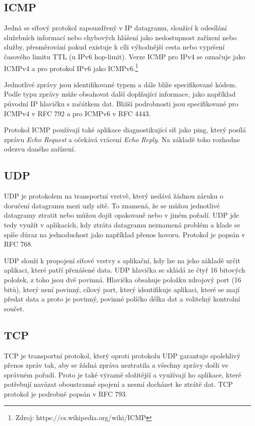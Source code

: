 \documentclass[11pt, a4paper]{article}
\begin{document}
\subsection{ICMP}

Jedná se síťový protokol zapouzdřený v IP datagramu, sloužící k odesílání služebních informací nebo chybových hlášení jako nedostupnost zařízení nebo služby, přesměrování pokud existuje k cíli výhodnější cesta nebo vypršení časového limitu TTL (u IPv6 hop-limit). 
Verze ICMP pro IPv4 se označuje jako ICMPv4 a pro protokol IPv6 jako ICMPv6.\footnote{Zdroj: https://cs.wikipedia.org/wiki/ICMP} 

Jednotlivé zprávy jsou identifikované typem a dále blíže specifikované kódem. 
Podle typu zprávy  může obsahovat další doplňující informace, jako například původní IP hlavičku s začátkem dat. 
Bližší podrobnosti jsou specifikované pro ICMPv4 v RFC 792 a pro ICMPv6 v RFC 4443. \cite{rfc:792, rfc:4443}

Protokol ICMP používají také aplikace diagnostikující síť jako ping, který posílá zprávu \emph{Echo Request} a očekává vrácení \emph{Echo Reply}. 
Na základě toho rozhodne odezvu daného zařízení. 

\subsection{UDP}

UDP je protokolem na transportní vrstvě, který nedává žádnou záruku o doručení datagramu mezi uzly sítě. 
To znamená, že se můžou jednotlivé datagramy ztratit nebo můžou dojít opakovaně nebo v jiném pořadí. 
UDP jde tedy využít v aplikacích, kdy ztráta datagramu neznamená problém a klade se spíše důraz na jednoduchost jako například přenos hovoru. 
Protokol je popsán v RFC 768. \cite{rfc:768}

UDP slouží k propojení síťové vrstvy s aplikační, kdy lze na jeho základě určit aplikaci, které patří pře\-ná\-še\-né data. 
UDP hlavička se skládá ze čtyř 16 bitových položek, z toho jsou dvě povinná. 
Hlavička obsahuje položku zdrojový port (16 bitů), který není povinný, cílový port, který identifikuje aplikaci, které se mají předat data a proto je povinný, povinné políčko délka dat a volitelný kontrolní součet.

\subsection{TCP}

TCP je transportní protokol, který oproti protokolu UDP garantuje spolehlivý přenos zpráv tak, aby se žádná zpráva neztratila a všechny zprávy došli ve správném pořadí. 
Proto je také výrazně složitější a využívají ho aplikace, které potřebují navázat oboustranné spojení a nesmí docházet ke ztrátě dat. 
TCP protokol je podrobně popsán v RFC 793. \cite{rfc:793}
\end{document}

